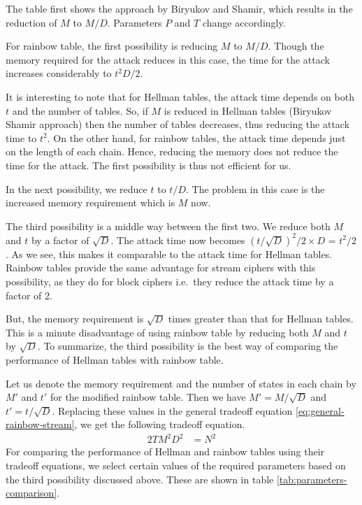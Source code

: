 The table first shows the approach by Biryukov and Shamir, which results in the reduction of $M$ to $M/D$. Parameters $P$ and $T$ change accordingly.

For rainbow table, the first possibility is reducing $M$ to $M/D$. Though the memory required for the attack reduces in this case, the time for the attack increases considerably to $t^2D/2$. 

It is interesting to note that for Hellman tables, the attack time depends on both $t$ and the number of tables. So, if $M$ is reduced in Hellman tables (Biryukov Shamir approach) then the number of tables decreases, thus reducing the attack time to $t^2$. On the other hand, for rainbow tables, the attack time depends just on the length of each chain. Hence, reducing the memory does not reduce the time for the attack. The first possibility is thus not efficient for us.

In the next possibility, we reduce $t$ to $t/D$. The problem in this case is the increased memory requirement which is $M$ now. 

The third possibility is a middle way between the first two. We reduce both $M$ and $t$ by a factor of $\sqrt{D}$. The attack time now becomes ${(t/\sqrt{D})}^2/2 \times D$ = $t^2/2$. As we see, this makes it comparable to the attack time for Hellman tables. Rainbow tables provide the same advantage for stream ciphers with this possibility, as they do for block ciphers i.e.~they reduce the attack time by a factor of 2. 

But, the memory requirement is $\sqrt{D}$ times greater than that for Hellman tables. This is a minute disadvantage of using rainbow table by reducing both $M$ and $t$ by $\sqrt{D}$. To summarize, the third possibility is the best way of comparing the performance of Hellman tables with rainbow table.

Let us denote the memory requirement and the number of states in each chain by $M'$ and $t'$ for the modified rainbow table. Then we have $M' = M/\sqrt{D}$ and $t' = t/\sqrt{D}$. Replacing these values in the general tradeoff equation \ref{eq:general-rainbow-stream}, we get the following tradeoff equation.
\begin{align}
\label{eq:tmdto-rainbow-stream} 2TM^2D^2 &= N^2
\end{align}
For comparing the performance of Hellman and rainbow tables using their tradeoff equations, we select certain values of the required parameters based on the third possibility discussed above. These are shown in table \ref{tab:parameters-comparison}.

